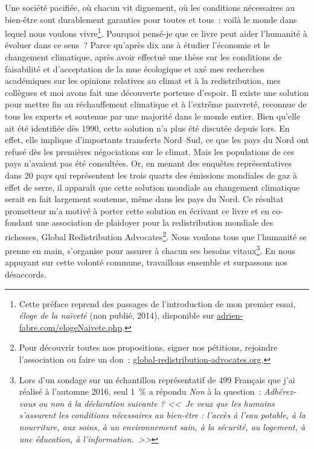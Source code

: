 \documentclass[a5paper,french,openany]{memoir}
\begin{document}
Une société pacifiée, où chacun vit dignement, où les conditions nécessaires au bien-être sont durablement garanties pour toutes et tous~: voilà le monde dans lequel nous voulons vivre\footnote{Cette préface reprend des passages de l'introduction de mon premier essai, \textit{éloge de la naïveté} (non publié, 2014), disponible sur \href{https://adrien-fabre.com/elogeNaivete.php}{adrien-fabre.com/elogeNaivete.php}.}. Pourquoi pensé-je que ce livre peut aider l'humanité à évoluer dans ce sens~? Parce qu'après dix ans à étudier l'économie et le changement climatique, après avoir effectué une thèse sur les conditions de faisabilité et d'acceptation de la mue écologique et axé mes recherches académiques sur les opinions relatives au climat et à la redistribution, mes collègues et moi avons fait une découverte porteuse d'espoir. %
Il existe une solution pour mettre fin au réchauffement climatique et à l'extrême pauvreté, reconnue de %
tous les experts et soutenue par une majorité dans le monde entier. 
Bien qu'elle ait été identifiée dès 1990, cette solution n'a plus été discutée %
depuis lors. En effet, elle implique d'importants transferts Nord--Sud, ce que les pays du Nord ont refusé dès les premières négociations sur le climat. Mais les populations de ces pays n'avaient pas été consultées. Or, en menant des enquêtes représentatives dans 20 pays qui représentent les trois quarts des émissions mondiales de gaz à effet de serre, il apparaît que cette solution mondiale au changement climatique serait en fait largement soutenue, même dans les pays du Nord. 
Ce résultat prometteur m'a motivé à porter cette solution en écrivant ce livre et en co-fondant une association de plaidoyer pour la redistribution mondiale des richesses, Global Redistribution Advocates\footnote{Pour découvrir toutes nos propositions, signer nos pétitions, rejoindre l'association ou faire un don~: \href{http://global-redistribution-advocates.org/}{global-redistribution-advocates.org}.}. %
Nous voulons tous que l'humanité se prenne en main, s'organise 
pour assurer à chacun ses besoins vitaux\footnote{Lors d'un sondage sur un échantillon représentatif de 499 %
Français que j'ai réalisé à l'automne 2016, seul 1~\% a répondu \textit{Non} à la question~: \textit{Adhérez-vous ou non à la déclaration suivante ? <<~Je veux que les humains s'assurent les conditions nécessaires au bien-être : l'accès à l'eau potable, à la nourriture, aux soins, à un environnement sain, à la sécurité, au logement, à une éducation, à l'information.~>>}}. 
En nous appuyant sur cette volonté commune, travaillons ensemble et surpassons nos désaccords.
\end{document}
